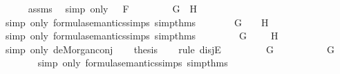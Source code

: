 \begin{isabellebody}
\ \ \ \ \isamarkupfalse%
\ assms{\isacharparenleft}{}{\isacharparenright}\ \isamarkupfalse%
\ {\isacharparenleft}simp\ only{\isacharcolon}\ {\isacartoucheopen}{\isasymA}\ {\isasymTurnstile}\ F{\isacartoucheclose}{\isacharparenright}\isanewline
\ \ \isamarkupfalse%
\ \isamarkupfalse%
\ {\isachardoublequoteopen}{\isasymnot}\ {\isacharparenleft}{\isasymA}\ {\isasymTurnstile}\ {\isacharparenleft}G\ \isactrlbold {\isasymand}\ H{\isacharparenright}{\isacharparenright}{\isachardoublequoteclose}\isanewline
\ \ \ \ \isamarkupfalse%
\ {\isacharparenleft}simp\ only{\isacharcolon}\ formula{\isacharunderscore}semantics{\isachardot}simps{\isacharparenleft}{}{\isacharparenright}\ simp{\isacharunderscore}thms{\isacharparenleft}{}{\isacharparenright}{\isacharparenright}\isanewline
\ \ \isamarkupfalse%
\ \isamarkupfalse%
\ {\isachardoublequoteopen}{\isasymnot}{\isacharparenleft}{\isasymA}\ {\isasymTurnstile}\ G\ {\isasymand}\ {\isasymA}\ {\isasymTurnstile}\ H{\isacharparenright}{\isachardoublequoteclose}\isanewline
\ \ \ \ \isamarkupfalse%
\ {\isacharparenleft}simp\ only{\isacharcolon}\ formula{\isacharunderscore}semantics{\isachardot}simps{\isacharparenleft}{}{\isacharparenright}\ simp{\isacharunderscore}thms{\isacharparenleft}{}{\isacharparenright}{\isacharparenright}\isanewline
\ \ \isamarkupfalse%
\ \isamarkupfalse%
\ {\isachardoublequoteopen}{\isasymnot}\ {\isacharparenleft}{\isasymA}\ {\isasymTurnstile}\ G{\isacharparenright}\ {\isasymor}\ {\isasymnot}\ {\isacharparenleft}{\isasymA}\ {\isasymTurnstile}\ H{\isacharparenright}{\isachardoublequoteclose}\isanewline
\ \ \ \ \isamarkupfalse%
\ {\isacharparenleft}simp\ only{\isacharcolon}\ de{\isacharunderscore}Morgan{\isacharunderscore}conj{\isacharparenright}\isanewline
\ \ \isamarkupfalse%
\ {\isacharquery}thesis\isanewline
\ \ \isamarkupfalse%
\ {\isacharparenleft}rule\ disjE{\isacharparenright}\isanewline
\ \ \ \ \isamarkupfalse%
\ {\isachardoublequoteopen}{\isasymnot}\ {\isacharparenleft}{\isasymA}\ {\isasymTurnstile}\ G{\isacharparenright}{\isachardoublequoteclose}\isanewline
\ \ \ \ \isamarkupfalse%
\ \isamarkupfalse%
\ {\isachardoublequoteopen}{\isasymA}\ {\isasymTurnstile}\ \isactrlbold {\isasymnot}\ G{\isachardoublequoteclose}\isanewline
\ \ \ \ \ \ \isamarkupfalse%
\ {\isacharparenleft}simp\ only{\isacharcolon}\ formula{\isacharunderscore}semantics{\isachardot}simps{\isacharparenleft}{}{\isacharparenright}\ simp{\isacharunderscore}thms{\isacharparenleft}{}{\isacharparenright}{\isacharparenright}\isanewline

\end{isabellebody}
